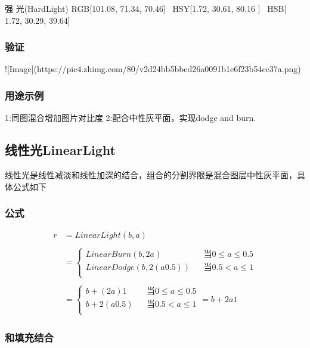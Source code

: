 强    光(HardLight)     RGB[101.08,  71.34,  70.46]~ HSY[1.72,  30.61,  80.16  ]~ HSB[  1.72,  30.29,  39.64]


\subsubsection{ 验证}

![Image](https://pic4.zhimg.com/80/v2d24bb5bbed26a0091b1e6f23b54cc37a.png)

\subsubsection{ 用途示例}

1:同图混合增加图片对比度
2:配合中性灰平面，实现dodge and burn.

\subsection{ 线性光LinearLight}

线性光是线性减淡和线性加深的结合，组合的分割界限是混合图层中性灰平面，具体公式如下

\subsubsection{ 公式}

$$\begin{aligned}r&= LinearLight(b,a)\\\\&=\left\{\begin{aligned}LinearBurn(b,2a)&&当 0\leq a \leq 0.5\\LinearDodge(b,2(a0.5))&&当 0.5< a \leq 1\\\end{aligned}\right.\\\\&=\left\{\begin{aligned}b+(2a)1&&当 0\leq a \leq 0.5\\b+2(a0.5)&&当 0.5< a \leq 1\\\end{aligned}\right.=b+2a1\end{aligned}$$

\subsubsection{ 和填充结合}

